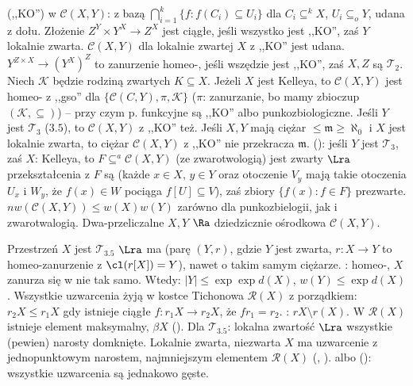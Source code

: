   (,,KO'') w $\mathcal C(X, Y)$: z bazą $\bigcap_{i=1}^k \{f : f(C_i) \subseteq U_i\}$ dla $C_i \subseteq^k X$, $U_i \subseteq_o Y$, udana z dołu.
Złożenie $Z^Y \times Y^X \to Z^X$ jest ciągłe, jeśli wszystko jest ,,KO'', zaś $Y$ lokalnie zwarta.
$\mathcal C(X, Y)$ dla lokalnie zwartej $X$ z ,,KO'' jest udana.
 $Y^{Z \times X} \to (Y^X)^Z$ to zanurzenie homeo-, jeśli wszędzie jest ,,KO'', zaś $X, Z$ są $\mathcal T_2$.
Niech $\mathcal K$ będzie rodziną zwartych $K \subseteq X$.
Jeżeli $X$ jest Kelleya, to $\mathcal C(X, Y)$ jest homeo- z ,,gso'' dla $\{\mathcal C(C, Y), \pi, \mathcal K\}$ ($\pi$: zanurzanie, bo mamy zbioczup $(\mathcal K, \subseteq)$) -- przy czym p. funkcyjne są ,,KO'' albo punkozbiologiczne.
Jeśli $Y$ jest $\mathcal T_3$ ($3.5$), to $\mathcal C(X, Y)$ z ,,KO'' też.
Jeśli $X, Y$ mają ciężar $\le \mathfrak m \ge \aleph_0$ i $X$ jest lokalnie zwarta, to ciężar $\mathcal C(X, Y)$ z ,,KO'' nie przekracza $\mathfrak m$.
 (): jeśli $Y$ jest $\mathcal T_3$, zaś $X$: Kelleya, to $F \subseteq^a \mathcal C(X, Y)$ (ze zwarotwologią) jest zwarty $\Lra$ przekształcenia z $F$ są  (każde $x \in X$, $y \in Y$ oraz otoczenie $V_y$ mają takie otoczenia $U_x$ i $W_y$, że $f(x) \in W$ pociąga $f[U] \subseteq V$), zaś zbiory $\{f(x) : f \in F\}$ prezwarte.
$nw(\mathcal C(X, Y))\le w(X) w(Y)$ zarówno dla punkozbielogii, jak i zwarotwalogią. 
Dwa-przeliczalne $X, Y$ $\Ra$ dziedzicznie ośrodkowa $\mathcal C(X, Y)$.

Przestrzeń  $X$ jest $\mathcal T_{3.5}$ $\Lra$ ma  (parę $(Y, r)$, gdzie $Y$ jest zwarta, $r \colon X \to Y$ to homeo-zanurzenie z $\cl (r[X]) = Y$), nawet o takim samym ciężarze.
: homeo-, $X$ zanurza się w nie tak samo.
Wtedy: $|Y| \le \exp \exp d(X)$, $w(Y) \le \exp d(X)$.
Wszystkie uzwarcenia żyją w kostce Tichonowa $\mathcal R(X)$ z porządkiem: $r_2 X \le r_1 X$ gdy istnieje ciągłe $f \colon r_1 X \to r_2X$, że $fr_1 = r_2$.
: $rX \setminus r(X)$.
W $\mathcal R(X)$ istnieje element maksymalny,  $\beta X$ ().
Dla $\mathcal T_{3.5}$: lokalna zwartość $\Lra$ wszystkie (pewien) narosty domknięte.
Lokalnie zwarta, niezwarta $X$ ma uzwarcenie z jednopunktowym narostem, najmniejszym elementem $\mathcal R(X)$ (, ).
 albo  (): wszystkie uzwarcenia są jednakowo gęste.

